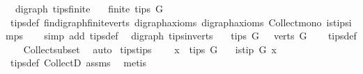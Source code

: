 \begin{isabellebody}
\isamarkupfalse%
%
\endisatagproof
{\isafoldproof}%
%
\isadelimproof
\isanewline
%
\endisadelimproof
\isanewline
{}\isamarkupfalse%
\ {\isacharparenleft}{\kern0pt}\ digraph{\isacharparenright}{\kern0pt}\ tips{\isacharunderscore}{\kern0pt}finite{\isacharcolon}{\kern0pt}\isanewline
\ \ \ {\isachardoublequoteopen}finite\ {\isacharparenleft}{\kern0pt}tips\ G{\isacharparenright}{\kern0pt}{\isachardoublequoteclose}\isanewline
%
\isadelimproof
\ \ %
\endisadelimproof
%
\isatagproof
{}\isamarkupfalse%
\ tips{\isacharunderscore}{\kern0pt}def\ fin{\isacharunderscore}{\kern0pt}digraph{\isachardot}{\kern0pt}finite{\isacharunderscore}{\kern0pt}verts\ digraph{\isachardot}{\kern0pt}axioms{\isacharparenleft}{\kern0pt}{}{\isacharparenright}{\kern0pt}\ digraph{\isacharunderscore}{\kern0pt}axioms\ Collect{\isacharunderscore}{\kern0pt}mono\ is{\isacharunderscore}{\kern0pt}tip{\isachardot}{\kern0pt}simps\isanewline
\ \ \isamarkupfalse%
\ {\isacharparenleft}{\kern0pt}simp\ add{\isacharcolon}{\kern0pt}\ tips{\isacharunderscore}{\kern0pt}def{\isacharparenright}{\kern0pt}%
\endisatagproof
{\isafoldproof}%
%
\isadelimproof
\isanewline
%
\endisadelimproof
\isanewline
{}\isamarkupfalse%
\ {\isacharparenleft}{\kern0pt}\ digraph{\isacharparenright}{\kern0pt}\ tips{\isacharunderscore}{\kern0pt}in{\isacharunderscore}{\kern0pt}verts{\isacharcolon}{\kern0pt}\isanewline
\ \ \ {\isachardoublequoteopen}tips\ G\ {\isasymsubseteq}\ \ verts\ G{\isachardoublequoteclose}%
\isadelimproof
\ \ %
\endisadelimproof
%
\isatagproof
{}\isamarkupfalse%
\ tips{\isacharunderscore}{\kern0pt}def\isanewline
\ \ \isamarkupfalse%
\ Collect{\isacharunderscore}{\kern0pt}subset\ \isamarkupfalse%
\ auto%
\endisatagproof
{\isafoldproof}%
%
\isadelimproof
%
\endisadelimproof
\isanewline
\isanewline
{}\isamarkupfalse%
\ tips{\isacharunderscore}{\kern0pt}tips{\isacharcolon}{\kern0pt}\ \isanewline
\ \ \ {\isachardoublequoteopen}x\ {\isasymin}\ tips\ G{\isachardoublequoteclose}\isanewline
\ \ \ {\isachardoublequoteopen}is{\isacharunderscore}{\kern0pt}tip\ G\ x{\isachardoublequoteclose}%
\isadelimproof
\ %
\endisadelimproof
%
\isatagproof
{}\isamarkupfalse%
\ tips{\isacharunderscore}{\kern0pt}def\ CollectD\ assms{\isacharparenleft}{\kern0pt}{}{\isacharparenright}{\kern0pt}\ \isamarkupfalse%
\ metis%
\endisatagproof
{\isafoldproof}%

\end{isabellebody}
